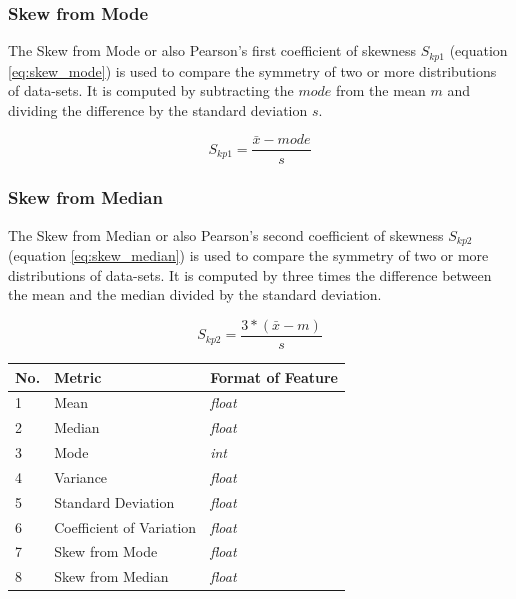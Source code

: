 \subsubsection{Skew from Mode}
The Skew from Mode or also Pearson's first coefficient of skewness $S_{kp1}$ \cite{awasthi2013statistics} (equation \ref{eq:skew_mode}) is used to compare the symmetry of two or more distributions of data-sets. It is computed by subtracting the $mode$ from the mean $m$ and dividing the difference by the standard deviation $s$.

\begin{equation}
S_{kp1} = \frac{\bar{x}-mode}{s}
\label{eq:skew_mode}
\end{equation}

\subsubsection{Skew from Median}
The Skew from Median or also Pearson's second coefficient of skewness $S_{kp2}$ \cite{awasthi2013statistics} (equation \ref{eq:skew_median}) is used to compare the symmetry of two or more distributions of data-sets. It is computed by three times the difference between the mean and the median divided by the standard deviation.

\begin{equation}
S_{kp2} = \frac{3*(\bar{x}-m)}{s}
\label{eq:skew_median}
\end{equation}

\begin{center}
\begin{tabular}{ |l|l|l| }
\hline
No. & Metric & Format of Feature \\
\hline
1 & Mean & \textit{float} \\
\hline
2 & Median & \textit{float} \\
\hline
3 & Mode & \textit{int} \\
\hline
4 & Variance & \textit{float} \\
\hline
5 & Standard Deviation & \textit{float} \\
\hline
6 & Coefficient of Variation & \textit{float} \\
\hline
7 & Skew from Mode & \textit{float} \\
\hline
8 & Skew from Median & \textit{float} \\
\hline
\end{tabular}
\label{tab:stat_met}
\end{center}

